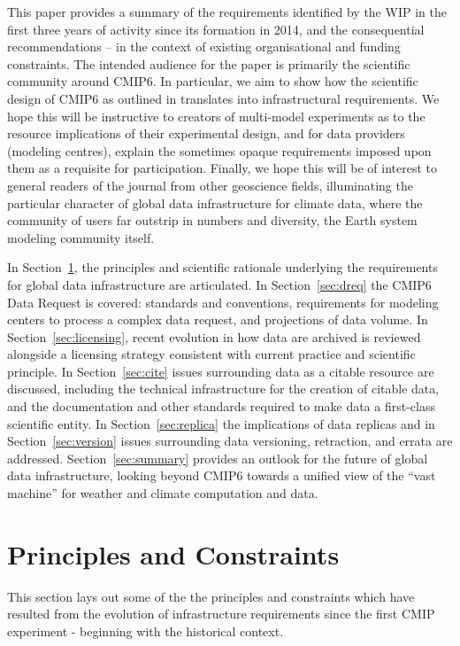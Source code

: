 \documentclass[gmd,manuscript]{copernicus}
\newcommand{\pllabel}[1]{\label{p-#1}\linelabel{l-#1}}
\begin{document}
This paper provides a summary of the requirements identified by the
WIP in the first three years of activity since its formation in 2014,
and the consequential recommendations -- in the context of existing
organisational and funding constraints.
\pllabel{RC1-Overview-1}
The intended audience for the paper is primarily the scientific
community around CMIP6. In particular, we aim to show how the
scientific design of CMIP6 as outlined in \cite{ref:eyringetal2016a}
translates into infrastructural requirements. We hope this will be
instructive to creators of multi-model experiments as to the resource
implications of their experimental design, and for data providers
(modeling centres), explain the sometimes opaque requirements imposed
upon them as a requisite for participation. Finally, we hope this will
be of interest to general readers of the journal from other geoscience
fields, illuminating the particular character of global data
infrastructure for climate data, where the community of users far
outstrip in numbers and diversity, the Earth system modeling community
itself.

In Section~\ref{sec:principles}, the principles and scientific
rationale underlying the requirements for global data infrastructure
are articulated. In Section~\ref{sec:dreq} the CMIP6 Data Request is
covered: standards and conventions, requirements for modeling centers
to process a complex data request, and projections of data volume. In
Section~\ref{sec:licensing}, recent evolution in how data are archived
is reviewed alongside a licensing strategy consistent with current
practice and scientific principle. In Section~\ref{sec:cite} issues
surrounding data as a citable resource are discussed, including the
technical infrastructure for the creation of citable data, and the
documentation and other standards required to make data a first-class
scientific entity. In Section~\ref{sec:replica} the implications of
data replicas and in Section~\ref{sec:version} issues surrounding data
versioning, retraction, and errata are addressed.
Section~\ref{sec:summary} provides an outlook for the future of global
data infrastructure, looking beyond CMIP6 towards a unified view of
the ``vast machine'' for weather and climate computation and data.


\section{Principles and Constraints}
\label{sec:principles}

This section lays out some of the the principles and constraints which
have resulted from the evolution of infrastructure requirements since
the first CMIP experiment - beginning with the historical context.
\end{document}

